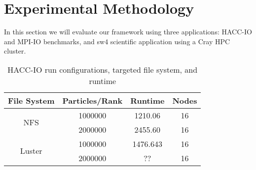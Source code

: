 \section{Experimental Methodology}\label{AA}
In this section we will evaluate our framework using three applications: HACC-IO and MPI-IO benchmarks, and sw4 scientific application using a Cray HPC cluster.

\begin{table}[]
	\centering
	\begin{tabular}{|c|c|c|c|}
		\hline
		File System	& Particles/Rank	& Runtime &	Nodes \\ \hline
		\multirow{2}{*}{NFS}	& 1000000	& 1210.06 &	16\\ \cline{2-4} 
		& 2000000	& 2455.60 &	16\\ \hline
		\multirow{2}{*}{Luster}	& 1000000	&  1476.643 &16 \\ \cline{2-4} 
		& 2000000	&  ?? &	16 \\ \hline
	\end{tabular}
	\caption{HACC-IO run configurations, targeted file system, and runtime}
	\label{table:HACC}
\end{table}


